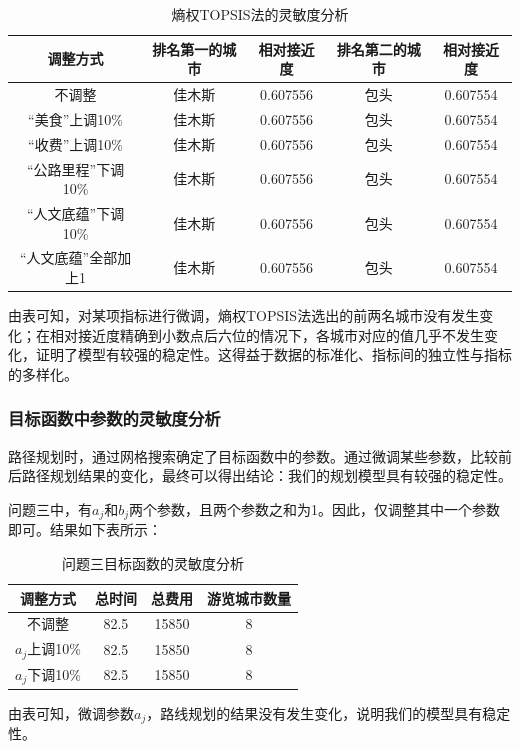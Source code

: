 \documentclass[UTF8,12pt]{ctexart}
\begin{document}
	\begin{table}[htbp]
		\centering
		\caption{熵权TOPSIS法的灵敏度分析}
		\begin{tabular}{c c c c c}
			\hline
			调整方式 & 排名第一的城市 & 相对接近度 & 排名第二的城市 & 相对接近度\\
			\hline
			不调整 & 佳木斯 & 0.607556 & 包头 & 0.607554\\
			“美食”上调10\% & 佳木斯 & 0.607556 & 包头 & 0.607554\\ 
			“收费”上调10\% & 佳木斯 & 0.607556 & 包头 & 0.607554\\ 
			“公路里程”下调10\% & 佳木斯 & 0.607556 & 包头 & 0.607554\\ 
			“人文底蕴”下调10\% & 佳木斯 & 0.607556 & 包头 & 0.607554\\
			“人文底蕴”全部加上1 & 佳木斯 & 0.607556 & 包头 & 0.607554\\
			\hline
		\end{tabular}
	\end{table}
	
	由表可知，对某项指标进行微调，熵权TOPSIS法选出的前两名城市没有发生变化；在相对接近度精确到小数点后六位的情况下，各城市对应的值几乎不发生变化，证明了模型有较强的稳定性。这得益于数据的标准化、指标间的独立性与指标的多样化。
	
	\subsubsection{目标函数中参数的灵敏度分析}
	
	路径规划时，通过网格搜索确定了目标函数中的参数。通过微调某些参数，比较前后路径规划结果的变化，最终可以得出结论：我们的规划模型具有较强的稳定性。
	
	问题三中，有$a_j$和$b_j$两个参数，且两个参数之和为1。因此，仅调整其中一个参数即可。结果如下表所示：
	
	\begin{table}[htbp]
		\centering
		\caption{问题三目标函数的灵敏度分析}
		\begin{tabular}{c c c c}
			\hline
			调整方式 & 总时间 & 总费用 & 游览城市数量 \\
			\hline
			不调整 & 82.5 & 15850 & 8 \\
			$a_j$上调10\% & 82.5 & 15850 & 8 \\
			$a_j$下调10\% & 82.5 & 15850 & 8 \\
			\hline
		\end{tabular}
	\end{table}
	
	由表可知，微调参数$a_j$，路线规划的结果没有发生变化，说明我们的模型具有稳定性。
	
\end{document}
